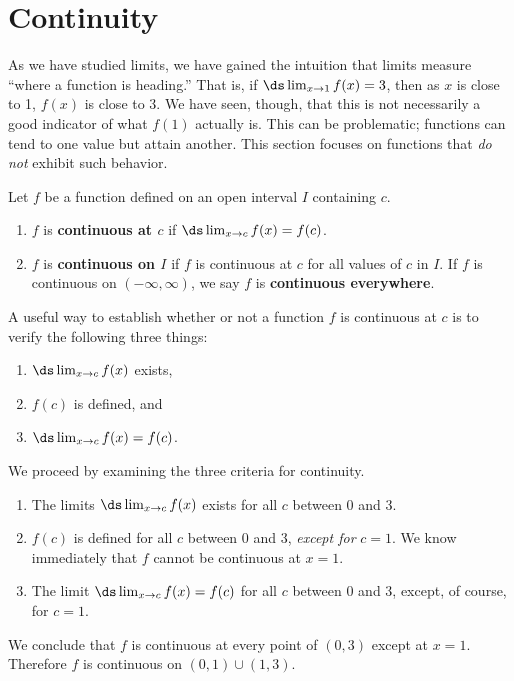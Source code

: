 \section{Continuity}\label{sec:continuity}
As we have studied limits, we have gained the intuition that limits measure ``where a function is heading.'' That is, if $\ds \lim_{x\to 1} f(x) = 3$, then as $x$ is close to 1, $f(x)$ is close to 3. We have seen, though, that this is not necessarily a good indicator of what $f(1)$ actually is. This can be problematic; functions can tend to one value but attain another. This section focuses on functions that \textit{do not} exhibit such behavior.

{Let $f$ be a function defined on an open interval $I$ containing $c$.  
	\begin{enumerate}
	\item		$f$ is \textbf{continuous at $c$} if $\ds \lim_{x\to c}f(x) = f(c)$.
	\item		$f$ is \textbf{continuous on $I$} if $f$ is continuous at $c$ for all values of $c$ in $I$. If $f$ is continuous on $(-\infty,\infty)$, we say $f$ is \textbf{continuous everywhere}.
	\end{enumerate}
}

A useful way to establish whether or not a function $f$ is continuous at $c$ is to verify the following three things:
		\begin{enumerate}
		\item		$\ds \lim_{x\to c} f(x)$ exists,
		\item		$f(c)$ is defined, and 
		\item		$\ds \lim_{x\to c} f(x) = f(c)$.
		\end{enumerate}
		
{We proceed by examining the three criteria for continuity.
	\begin{enumerate}
	\item		The limits $\ds \lim_{x\to c} f(x)$ exists for all $c$ between 0 and 3.
	\item		$f(c)$ is defined for all $c$ between 0 and 3, \textit{except for} $c=1$. We know immediately that $f$ cannot be continuous at $x=1$.
	\item		The limit $\ds \lim_{x\to c} f(x) = f(c)$ for all $c$ between 0 and 3, except, of course, for $c=1$. 
	\end{enumerate}

We conclude that $f$ is continuous at every point of $(0,3)$ except at $x=1$. Therefore $f$ is continuous on $(0,1)\cup(1,3)$.}\\

